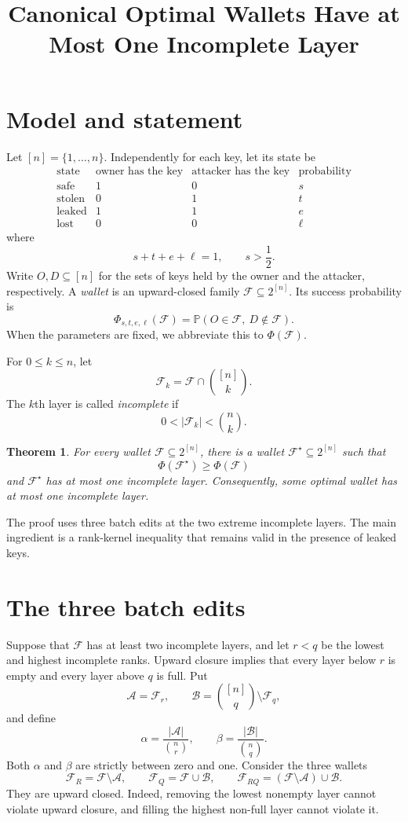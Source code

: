 \documentclass[11pt]{article}
\title{Canonical Optimal Wallets Have at Most One Incomplete Layer}
\author{}
\date{}
\newtheorem{theorem}{Theorem}
\newcommand{\PP}{\mathbb P}
\newcommand{\cF}{\mathcal F}
\newcommand{\cA}{\mathcal A}
\newcommand{\cB}{\mathcal B}
\newcommand{\1}{\mathbf 1}
\begin{document}
\maketitle

\section{Model and statement}

Let $[n]=\{1,\dots,n\}$.  Independently for each key, let its state be
\[
\begin{array}{c|c|c|c}
\text{state}&\text{owner has the key}&\text{attacker has the key}
&\text{probability}\\
\hline
\text{safe}&1&0&s\\
\text{stolen}&0&1&t\\
\text{leaked}&1&1&e\\
\text{lost}&0&0&\ell
\end{array}
\]
where
\[
s+t+e+\ell=1,
\qquad
s>\frac12.
\]
Write $O,D\subseteq[n]$ for the sets of keys held by the owner and the
attacker, respectively.  A \emph{wallet} is an upward-closed family
$\cF\subseteq 2^{[n]}$.  Its success probability is
\[
\Phi_{s,t,e,\ell}(\cF)
   =\PP(O\in\cF,\ D\notin\cF).
\]
When the parameters are fixed, we abbreviate this to $\Phi(\cF)$.

For $0\leq k\leq n$, let
\[
\cF_k=\cF\cap\binom{[n]}k.
\]
The $k$th layer is called \emph{incomplete} if
\[
0<|\cF_k|<\binom nk.
\]

\begin{theorem}\label{thm:main}
For every wallet $\cF\subseteq2^{[n]}$, there is a wallet
$\cF^\star\subseteq2^{[n]}$ such that
\[
\Phi(\cF^\star)\geq\Phi(\cF)
\]
and $\cF^\star$ has at most one incomplete layer.  Consequently, some
optimal wallet has at most one incomplete layer.
\end{theorem}

The proof uses three batch edits at the two extreme incomplete layers.
The main ingredient is a rank-kernel inequality that remains valid in
the presence of leaked keys.

\section{The three batch edits}

Suppose that $\cF$ has at least two incomplete layers, and let $r<q$ be
the lowest and highest incomplete ranks.  Upward closure implies that
every layer below $r$ is empty and every layer above $q$ is full.  Put
\[
\cA=\cF_r,
\qquad
\cB=\binom{[n]}q\setminus\cF_q,
\]
and define
\[
\alpha=\frac{|\cA|}{\binom nr},
\qquad
\beta=\frac{|\cB|}{\binom nq}.
\]
Both $\alpha$ and $\beta$ are strictly between zero and one.  Consider
the three wallets
\[
\cF_R=\cF\setminus\cA,
\qquad
\cF_Q=\cF\cup\cB,
\qquad
\cF_{RQ}=(\cF\setminus\cA)\cup\cB.
\]
They are upward closed.  Indeed, removing the lowest nonempty layer
cannot violate upward closure, and filling the highest non-full layer
cannot violate it.
\end{document}
